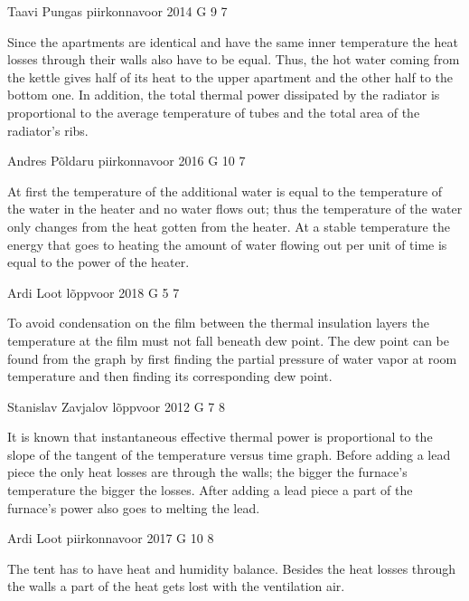 \documentclass[11pt]{article}
\begin{document}
{Taavi Pungas} %
{piirkonnavoor} %
{2014} %
{G 9} %
{7} %
{

\ifEngHint
Since the apartments are identical and have the same inner temperature the heat losses through their walls also have to be equal. Thus, the hot water coming from the kettle gives half of its heat to the upper apartment and the other half to the bottom one. In addition, the total thermal power dissipated by the radiator is proportional to the average temperature of tubes and the total area of the radiator’s ribs.
\fi
}

{Andres Põldaru} %
{piirkonnavoor} %
{2016} %
{G 10} %
{7} %
{

\ifEngHint
At first the temperature of the additional water is equal to the temperature of the water in the heater and no water flows out; thus the temperature of the water only changes from the heat gotten from the heater. At a stable temperature the energy that goes to heating the amount of water flowing out per unit of time is equal to the power of the heater.
\fi
}

{Ardi Loot} %
{lõppvoor} %
{2018} %
{G 5} %
{7} %
{

\ifEngHint
To avoid condensation on the film between the thermal insulation layers the temperature at the film must not fall beneath dew point. The dew point can be found from the graph by first finding the partial pressure of water vapor at room temperature and then finding its corresponding dew point.
\fi
}

{Stanislav Zavjalov} %
{lõppvoor} %
{2012} %
{G 7} %
{8} %
{

\ifEngHint
It is known that instantaneous effective thermal power is proportional to the slope of the tangent of the temperature versus time graph. Before adding a lead piece the only heat losses are through the walls; the bigger the furnace’s temperature the bigger the losses. After adding a lead piece a part of the furnace’s power also goes to melting the lead.
\fi
}

{Ardi Loot} %
{piirkonnavoor} %
{2017} %
{G 10} %
{8} %
{

\ifEngHint
The tent has to have heat and humidity balance. Besides the heat losses through the walls a part of the heat gets lost with the ventilation air.
\fi
}
\end{document}
